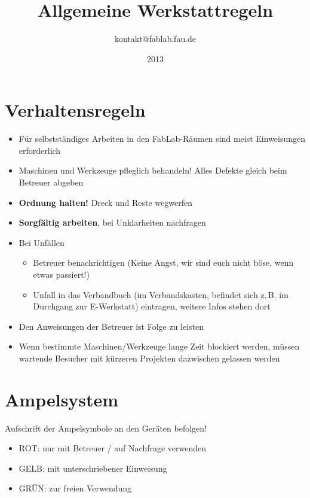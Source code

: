 \documentclass[13pt]{\basedir/fablab-document}
\date{2013}
\author{kontakt@fablab.fau.de}
\title{Allgemeine Werkstattregeln}
\begin{document}
\maketitle

\vbox{\vspace{1cm}}


\section{Verhaltensregeln}
\begin{itemize}
  \item Für selbstständiges Arbeiten in den FabLab-Räumen sind meist Einweisungen erforderlich
  \item Maschinen und Werkzeuge pfleglich behandeln! Alles Defekte gleich beim Betreuer abgeben
  \item \textbf{Ordnung halten!} Dreck und Reste wegwerfen
  \item \textbf{Sorgfältig arbeiten}, bei Unklarheiten nachfragen
  \item Bei Unfällen
  \begin{itemize}
  	\item Betreuer benachrichtigen (Keine Angst, wir sind euch nicht böse, wenn etwas passiert!)
  	\item Unfall in das Verbandbuch (im Verbandskasten, befindet sich z.\,B. im Durchgang zur E-Werkstatt) eintragen, weitere Infos stehen dort
  \end{itemize} 
  \item Den Anweisungen der Betreuer ist Folge zu leisten
  \item Wenn bestimmte Maschinen/Werkzeuge lange Zeit blockiert werden, müssen wartende Besucher mit kürzeren Projekten dazwischen gelassen werden
\end{itemize}
\vbox{\vspace{0,5cm}}

\section{Ampelsystem}
Aufschrift der Ampelsymbole an den Geräten befolgen!
\begin{itemize}
 \item ROT: nur mit Betreuer / auf Nachfrage verwenden
 \item GELB: mit unterschriebener Einweisung
 \item GRÜN: zur freien Verwendung
\end{itemize}
\end{document}
